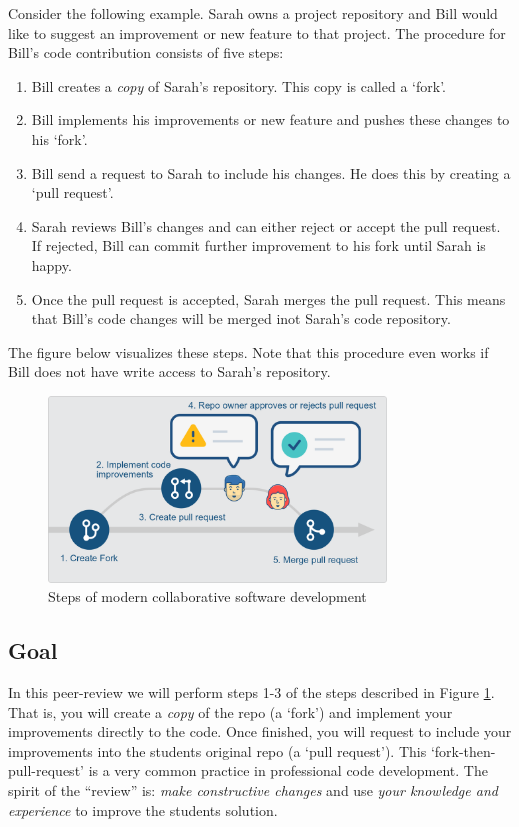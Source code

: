 \documentclass[a4paper]{article}
\begin{document}
Consider the following example. Sarah owns a project repository and Bill would like to suggest an improvement or new feature to that project. The procedure for Bill's code contribution consists of five steps:
\begin{enumerate}
\item Bill creates a \emph{copy} of Sarah's repository. This copy is called a `fork'.
\item Bill implements his improvements or new feature and pushes these changes to his `fork'.
\item Bill send a request to Sarah to include his changes. He does this by creating a `pull request'.
\item Sarah reviews Bill's changes and can either reject or accept the pull request. If rejected, Bill can commit further improvement to his fork until Sarah is happy.
\item Once the pull request is accepted, Sarah merges the pull request. This means that Bill's code changes will be merged inot Sarah's code repository.
\end{enumerate}

The figure below visualizes these steps. Note that this procedure even works if Bill does not have write access to Sarah's repository.

\begin{figure}[h!]
\centering
\includegraphics[width=0.8\textwidth]{collaboration.png}
\caption{Steps of modern collaborative software development}\label{fig:steps}
\end{figure}


\subsection{Goal}
In this peer-review we will perform steps 1-3 of the steps described in Figure \ref{fig:steps}.
That is, you will create a \emph{copy} of the repo (a `fork') and implement your improvements directly to the code. Once finished, you will request to include your improvements into the students original repo (a `pull request'). This `fork-then-pull-request' is a very common practice in professional code development. 
The spirit of the ``review'' is: \emph{make constructive changes} and use \emph{your knowledge and experience} to improve the students solution. 
\end{document}
